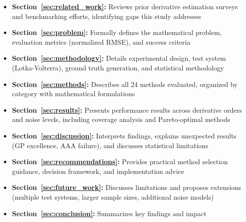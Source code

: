 \begin{itemize}
    \item \textbf{Section~\ref{sec:related_work}:} Reviews prior derivative estimation surveys and benchmarking efforts, identifying gaps this study addresses
    \item \textbf{Section~\ref{sec:problem}:} Formally defines the mathematical problem, evaluation metrics (normalized RMSE), and success criteria
    \item \textbf{Section~\ref{sec:methodology}:} Details experimental design, test system (Lotka-Volterra), ground truth generation, and statistical methodology
    \item \textbf{Section~\ref{sec:methods}:} Describes all 24 methods evaluated, organized by category with mathematical formulations
    \item \textbf{Section~\ref{sec:results}:} Presents performance results across derivative orders and noise levels, including coverage analysis and Pareto-optimal methods
    \item \textbf{Section~\ref{sec:discussion}:} Interprets findings, explains unexpected results (GP excellence, AAA failure), and discusses statistical limitations
    \item \textbf{Section~\ref{sec:recommendations}:} Provides practical method selection guidance, decision framework, and implementation advice
    \item \textbf{Section~\ref{sec:future_work}:} Discusses limitations and proposes extensions (multiple test systems, larger sample sizes, additional noise models)
    \item \textbf{Section~\ref{sec:conclusion}:} Summarizes key findings and impact
\end{itemize}
